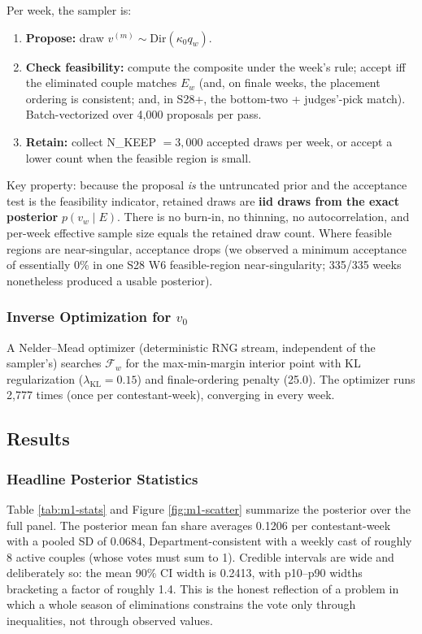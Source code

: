 \documentclass{article}
\begin{document}
Per week, the sampler is:
\begin{enumerate}
  \item \textbf{Propose:} draw $v^{(m)} \sim \mathrm{Dir}(\kappa_0 q_w)$.
  \item \textbf{Check feasibility:} compute the composite under the week's rule; accept iff the eliminated couple matches $E_w$ (and, on finale weeks, the placement ordering is consistent; and, in S28+, the bottom-two + judges'-pick match). Batch-vectorized over 4{,}000 proposals per pass.
  \item \textbf{Retain:} collect N\_KEEP $= 3{,}000$ accepted draws per week, or accept a lower count when the feasible region is small.
\end{enumerate}
Key property: because the proposal \emph{is} the untruncated prior and the acceptance test is the feasibility indicator, retained draws are \textbf{iid draws from the exact posterior} $p(v_w \mid E)$. There is no burn-in, no thinning, no autocorrelation, and per-week effective sample size equals the retained draw count. Where feasible regions are near-singular, acceptance drops (we observed a minimum acceptance of essentially 0\% in one S28 W6 feasible-region near-singularity; 335/335 weeks nonetheless produced a usable posterior).

\subsubsection{Inverse Optimization for $v_0$}

A Nelder--Mead optimizer (deterministic RNG stream, independent of the sampler's) searches $\mathcal{F}_w$ for the max-min-margin interior point with KL regularization ($\lambda_{\text{KL}} = 0.15$) and finale-ordering penalty (25.0). The optimizer runs 2{,}777 times (once per contestant-week), converging in every week.

\subsection{Results}
\label{sec:model1-results}

\subsubsection{Headline Posterior Statistics}

Table \ref{tab:m1-stats} and Figure \ref{fig:m1-scatter} summarize the posterior over the full panel. The posterior mean fan share averages 0.1206 per contestant-week with a pooled SD of 0.0684, Department-consistent with a weekly cast of roughly 8 active couples (whose votes must sum to 1). Credible intervals are wide and deliberately so: the mean 90\% CI width is 0.2413, with p10--p90 widths bracketing a factor of roughly 1.4. This is the honest reflection of a problem in which a whole season of eliminations constrains the vote only through inequalities, not through observed values.
\end{document}
